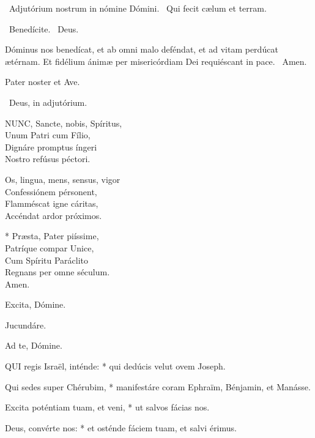 \sectionornament

\V\ Adjutórium nostrum in nómine Dómini. \R\ Qui fecit cælum et terram.

\V\ Benedícite. \R\ Deus.

 Dóminus nos benedícat, et ab omni malo deféndat, et ad vitam perdúcat ætérnam. Et fidélium ánimæ per misericórdiam Dei requiéscant in pace. \R\ Amen.


\sectionornament


Pater noster et Ave.

\V\ Deus, in adjutórium.


\lettrine[lines=2]{N}{UNC}, Sancte, nobis, Spíritus,\\
Unum Patri cum Fílio,\\
Dignáre promptus íngeri\\
Nostro refúsus péctori.

Os, lingua, mens, sensus, vigor\\
Confessiónem pérsonent,\\
Flamméscat igne cáritas,\\
Accéndat ardor próximos.

* Præsta, Pater piíssime,\\
Patríque compar Unice,\\
Cum Spíritu Paráclito\\
Regnans per omne séculum.\\
Amen.

  Excita, Dómine.


  Jucundáre.

  Ad te, Dómine.


\lettrine[lines=2]{Q}{UI} regis Israël, inténde: * qui dedúcis velut ovem Joseph.

Qui sedes super Chérubim, * manifestáre coram Ephraïm, Bénjamin, et Manásse.

Excita poténtiam tuam, et veni, * ut salvos fácias nos.

Deus, convérte nos: * et osténde fáciem tuam, et salvi érimus.

